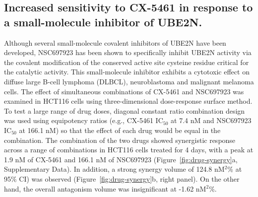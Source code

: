 \subsection{Increased sensitivity to CX-5461 in response to a small-molecule inhibitor of UBE2N.}
Although several small-molecule covalent inhibitors of UBE2N have been developed\cite{Tsukamoto2008,Ushiyama2012,Strickson2013}, NSC697923 has been shown to specifically inhibit UBE2N activity via the covalent modification of the conserved active site cysteine residue critical for the catalytic activity\cite{Hodge2015a}. 
This small-molecule inhibitor exhibits a cytotoxic effect on diffuse large B-cell lymphoma (DLBCL), neuroblastoma and malignant melanoma cells\cite{Pulvino2012,Cheng2014,Dikshit2018a}. 
The effect of simultaneous combinations of CX-5461 and NSC697923 was examined in HCT116 cells using three-dimensional dose-response surface method\cite{Prichard1990,Prichard1993}. 
To test a large range of drug doses, diagonal constant ratio combination design was used using equipotency ratios (e.g., CX-5461 IC$_{50}$ at 7.4 nM and NSC697923 IC$_{50}$ at 166.1 nM) so that the effect of each drug would be equal in the combination\cite{Chou2006}. 
The combination of the two drugs showed synergistic response across a range of combinations in HCT116 cells treated for 4 days, with a peak at 1.9 nM of CX-5461 and 166.1 nM of NSC697923 (Figure~\ref{fig:drug-synergy}a, Supplementary Data). 
In addition, a strong synergy volume of 124.8 nM$^2$\% at 95\% CI) was observed (Figure~\ref{fig:drug-synergy}b, right panel). 
On the other hand, the overall antagonism volume was insignificant at -1.62 nM$^2$\%.